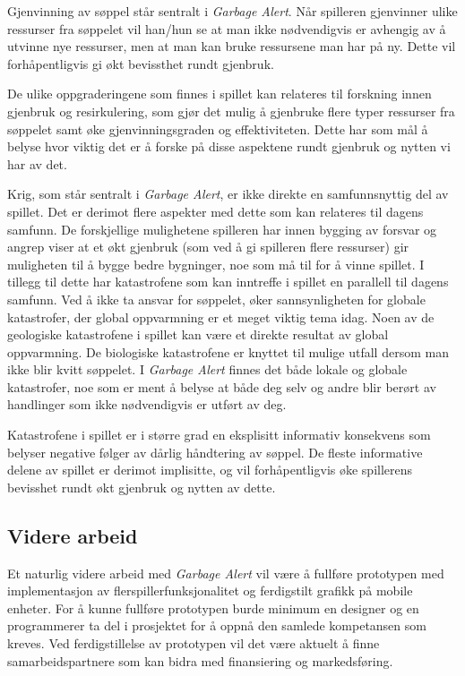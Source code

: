 Gjenvinning av søppel står sentralt i \emph{Garbage Alert}. Når spilleren gjenvinner ulike ressurser fra søppelet vil han/hun se at man ikke nødvendigvis er avhengig av å utvinne nye ressurser, men at man kan bruke ressursene man har på ny. Dette vil forhåpentligvis gi økt bevissthet rundt gjenbruk.

De ulike oppgraderingene som finnes i spillet kan relateres til forskning innen gjenbruk og resirkulering, som gjør det mulig å gjenbruke flere typer ressurser fra søppelet samt øke gjenvinningsgraden og effektiviteten. Dette har som mål å belyse hvor viktig det er å forske på disse aspektene rundt gjenbruk og nytten vi har av det.

Krig, som står sentralt i \emph{Garbage Alert}, er ikke direkte en samfunnsnyttig del av spillet. Det er derimot flere aspekter med dette som kan relateres til dagens samfunn. De forskjellige mulighetene spilleren har innen bygging av forsvar og angrep viser at et økt gjenbruk (som ved å gi spilleren flere ressurser) gir muligheten til å bygge bedre bygninger, noe som må til for å vinne spillet. I tillegg til dette har katastrofene som kan inntreffe i spillet en parallell til dagens samfunn. Ved å ikke ta ansvar for søppelet, øker sannsynligheten for globale katastrofer, der global oppvarmning er et meget viktig tema idag. Noen av de geologiske katastrofene i spillet kan være et direkte resultat av global oppvarmning. De biologiske katastrofene er knyttet til mulige utfall dersom man ikke blir kvitt søppelet. I \emph{Garbage Alert} finnes det både lokale og globale katastrofer, noe som er ment å belyse at både deg selv og andre blir berørt av handlinger som ikke nødvendigvis er utført av deg.

Katastrofene i spillet er i større grad en eksplisitt informativ konsekvens som belyser negative følger av dårlig håndtering av søppel. De fleste informative delene av spillet er derimot implisitte, og vil forhåpentligvis øke spillerens bevisshet rundt økt gjenbruk og nytten av dette. 

\subsection{Videre arbeid}
Et naturlig videre arbeid med \emph{Garbage Alert} vil være å fullføre prototypen med implementasjon av flerspillerfunksjonalitet og ferdigstilt grafikk på mobile enheter. For å kunne fullføre prototypen burde minimum en designer og en programmerer ta del i prosjektet for å oppnå den samlede kompetansen som kreves. Ved ferdigstillelse av prototypen vil det være aktuelt å finne samarbeidspartnere som kan bidra med finansiering og markedsføring.
